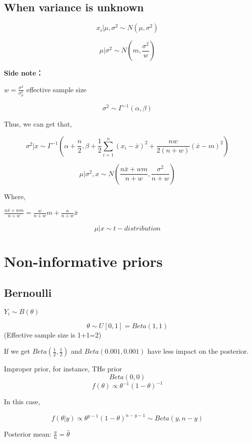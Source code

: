 \documentclass[]{book}
\begin{document}
\hypertarget{when-variance-is-unknown}{%
\subsection{When variance is unknown}\label{when-variance-is-unknown}}

\[x_i | \mu, \sigma^2 \sim N (\mu, \sigma^2)\]

\[\mu | \sigma^2 \sim N(m, \frac{\sigma^2}{w})\]

\textbf{Side note：}

\(w=\frac{\sigma^2}{\sigma_{\mu}^2}\) effective sample size

\[\sigma^2 \sim \Gamma^{-1}(\alpha, \beta)\]

Thus, we can get that,

\[\sigma^2 | x\sim \Gamma^{-1}(\alpha+\frac{n}{2}, \beta+\frac{1}{2} \sum_{i=1}^{n}(x_i-\bar{x})^2+\frac{nw}{2(n+w)}(\bar{x}-m)^2)\]

\[\mu| \sigma^2,x \sim N(\frac{n \bar{x}+wm}{n+w},\frac{\sigma^2}{n+w})\]

Where,

\(\frac{n \bar{x}+wm}{n+w} = \frac{w}{n+w}m+\frac{n}{n+w}\bar{x}\)

\[\mu |x \sim t - distribution \]

\hypertarget{non-informative-priors}{%
\section{Non-informative priors}\label{non-informative-priors}}

\hypertarget{bernoulli}{%
\subsection{Bernoulli}\label{bernoulli}}

\(Y_i \sim B(\theta)\)

\[\theta \sim U[0,1]= Beta (1,1)\]
(Effective sample size is 1+1=2)

If we get \(Beta(\frac{1}{2},\frac{1}{2})\) and \(Beta(0.001, 0.001)\) have less impact on the posterior.

Improper prior, for instance,
THe prior \[Beta (0,0)\]
\[f(\theta) \propto \theta ^{-1}(1-\theta)^{-1}\]

In this case,

\[f(\theta| y) \propto \theta^{y-1}(1-\theta)^{n-y-1} \sim Beta(y, n-y)\]

Posterior mean: \(\frac{y}{n}=\hat{\theta}\)
\end{document}
